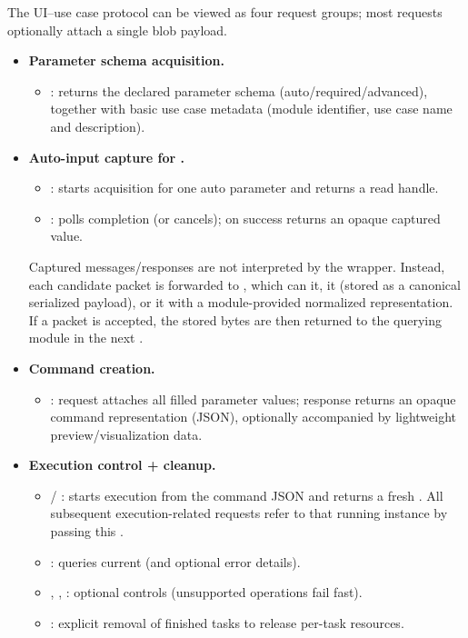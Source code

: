 The UI--use case protocol can be viewed as four request groups; most requests optionally attach a single blob payload.
\begin{itemize}
    \item \textbf{Parameter schema acquisition.}
    \begin{itemize}
        \item {}: returns the declared parameter schema (auto/\allowbreak required/\allowbreak advanced), together with basic use case metadata (module identifier, use case name and description).
    \end{itemize}

    \item \textbf{Auto-input capture for .}
    \begin{itemize}
        \item {}: starts acquisition for one auto parameter and returns a read handle.
        \item {}: polls completion (or cancels); on success returns an opaque captured value.
    \end{itemize}
    Captured messages/responses are not interpreted by the wrapper. Instead, each candidate packet is forwarded to , which can  it,  it (stored as a canonical serialized payload), or  it with a module-provided normalized representation. If a packet is accepted, the stored bytes are then returned to the querying module in the next .

    \item \textbf{Command creation.}
    \begin{itemize}
        \item {}: request attaches all filled parameter values; response returns an opaque command representation (JSON), optionally accompanied by lightweight preview/visualization data.
    \end{itemize}

    \item \textbf{Execution control + cleanup.}
    \begin{itemize}
        \item {} / : starts execution from the command JSON and returns a fresh . All subsequent execution-related requests refer to that running instance by passing this .
        \item {}: queries current  (and optional error details).
        \item {}, , : optional controls (unsupported operations fail fast).
        \item {}: explicit removal of finished tasks to release per-task resources.
    \end{itemize}
\end{itemize}

